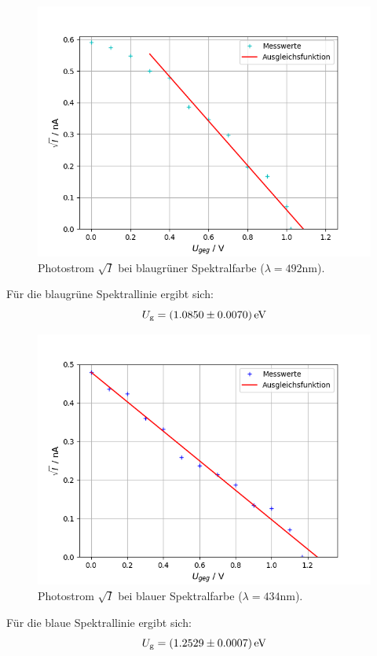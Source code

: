 \documentclass[
  bibliography=totoc,     %
  captions=tableheading,  %
  titlepage=firstiscover, %
]{scrartcl}
\begin{document}
\begin{figure}[H]
    \centering
    \includegraphics[scale=0.7]{Auswertung/aZyan.png}
    \caption{Photostrom $\sqrt{I}$ bei blaugrüner Spektralfarbe ($\lambda = 492 \text{nm}$).}
    \label{fig:blaugrün}
\end{figure}
Für die blaugrüne Spektrallinie ergibt sich:
\begin{equation*}
	U_\text{g} = \SI{1.085 \pm 0.0070}{\eV}
\end{equation*}

\begin{figure}[H]
    \centering
    \includegraphics[scale=0.7]{Auswertung/aBlau.png}
    \caption{Photostrom $\sqrt{I}$ bei blauer Spektralfarbe ($\lambda = 434 \text{nm}$).}
    \label{fig:blau}
\end{figure}
Für die blaue Spektrallinie ergibt sich:
\begin{equation*}
	U_\text{g} = \SI{1.2529 \pm 0.0007}{\eV}
\end{equation*}
\end{document}

